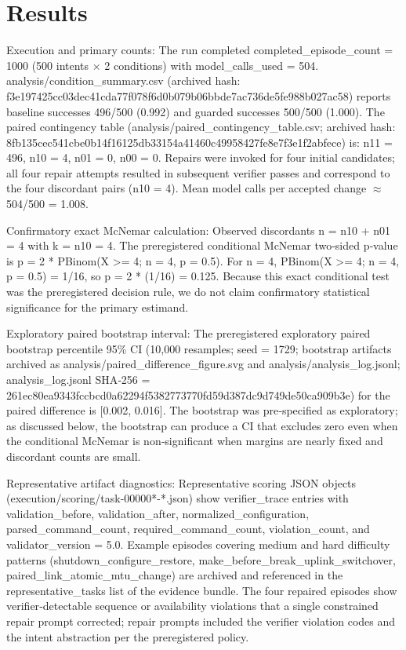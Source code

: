\documentclass[conference]{IEEEtran}
\begin{document}
\section{Results}
Execution and primary counts: The run completed completed\_episode\_count = 1000 (500 intents \ensuremath{\times} 2 conditions) with model\_calls\_used = 504. analysis/condition\_summary.csv (archived hash: f3e19742\allowbreak{}5cc03dec\allowbreak{}41cda77f\allowbreak{}078f6d0b\allowbreak{}079b06bb\allowbreak{}de7ac736\allowbreak{}de5fe988\allowbreak{}b027ac58) reports baseline successes 496/500 (0.992) and guarded successes 500/500 (1.000). The paired contingency table (analysis/paired\_contingency\_table.csv; archived hash: 8fb135ce\allowbreak{}c541cbe0\allowbreak{}b14f1612\allowbreak{}5db33154\allowbreak{}a41460c4\allowbreak{}9958427f\allowbreak{}e8e7f3e1\allowbreak{}f2abfece) is: n11 = 496, n10 = 4, n01 = 0, n00 = 0. Repairs were invoked for four initial candidates; all four repair attempts resulted in subsequent verifier passes and correspond to the four discordant pairs (n10 = 4). Mean model calls per accepted change \ensuremath{\approx} 504/500 = 1.008.

Confirmatory exact McNemar calculation: Observed discordants n = n10 + n01 = 4 with k = n10 = 4. The preregistered conditional McNemar two‑sided p‑value is p = 2 * PBinom(X >= 4; n = 4, p = 0.5). For n = 4, PBinom(X >= 4; n = 4, p = 0.5) = 1/16, so p = 2 * (1/16) = 0.125. Because this exact conditional test was the preregistered decision rule, we do not claim confirmatory statistical significance for the primary estimand.

Exploratory paired bootstrap interval: The preregistered exploratory paired bootstrap percentile 95\% CI (10,000 resamples; seed = 1729; bootstrap artifacts archived as analysis/paired\_difference\_figure.svg and analysis/analysis\_log.jsonl; analysis\_log.jsonl SHA‑256 = 261ec80e\allowbreak{}a9343fcc\allowbreak{}bcd0a622\allowbreak{}94f53827\allowbreak{}73770fd5\allowbreak{}9d387dc9\allowbreak{}d749de50\allowbreak{}ca909b3e) for the paired difference is [0.002, 0.016]. The bootstrap was pre‑specified as exploratory; as discussed below, the bootstrap can produce a CI that excludes zero even when the conditional McNemar is non‑significant when margins are nearly fixed and discordant counts are small.

Representative artifact diagnostics: Representative scoring JSON objects (execution/scoring/task-00000*-*.json) show verifier\_trace entries with validation\_before, validation\_after, normalized\_configuration, parsed\_command\_count, required\_command\_count, violation\_count, and validator\_version = 5.0. Example episodes covering medium and hard difficulty patterns (shutdown\_configure\_restore, make\_before\_break\_uplink\_switchover, paired\_link\_atomic\_mtu\_change) are archived and referenced in the representative\_tasks list of the evidence bundle. The four repaired episodes show verifier‑detectable sequence or availability violations that a single constrained repair prompt corrected; repair prompts included the verifier violation codes and the intent abstraction per the preregistered policy.
\end{document}
